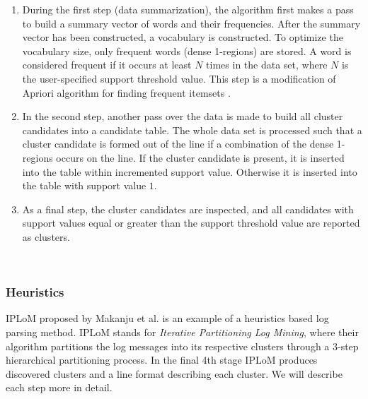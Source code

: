     \begin{enumerate}
       \item During the first step (data summarization), the algorithm first makes a pass to build a summary vector of words and their frequencies. After the summary vector has been constructed, a vocabulary is constructed. To optimize the vocabulary size, only frequent words (dense 1-regions) are stored. A word is considered frequent if it occurs at least $N$ times in the data set, where $N$ is the user-specified support threshold value. This step is a modification of Apriori algorithm for finding frequent itemsets \cite{Agrawal94fastalgorithms}. 
       
       \item In the second step, another pass over the data is made to build all cluster candidates into a candidate table. The whole data set is processed such that a cluster candidate is formed out of the line if a combination of the dense 1-regions occurs on the line. If the cluster candidate is present, it is inserted into the table within incremented support value. Otherwise it is inserted into the table with support value $1$.  
       
       \item As a final step, the cluster candidates are inspected, and all candidates with support values equal or greater than the support threshold value are reported as clusters. 
   \end{enumerate} \\
   
    
    \subsubsection*{Heuristics}
    IPLoM proposed by Makanju et al. \cite{Makanju2009ALA} is an example of a heuristics based log parsing method. IPLoM stands for \textit{Iterative Partitioning Log Mining}, where their algorithm partitions the log messages into its respective clusters through a 3-step hierarchical partitioning process. In the final 4th stage IPLoM produces discovered clusters and a line format describing each cluster. We will describe each step more in detail.\\
    
